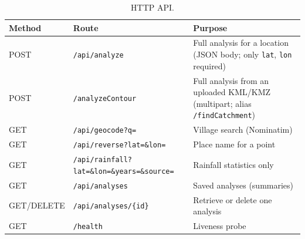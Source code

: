 \documentclass[11pt,a4paper]{article}
\newcommand{\code}[1]{\texttt{\small #1}}
\begin{document}
\begin{table}[H]
\centering\small
\caption{HTTP API.}
\label{tab:api}
\begin{tabularx}{\textwidth}{@{}l>{\raggedright\arraybackslash}p{5.3cm}Y@{}}
\toprule
Method & Route & Purpose \\
\midrule
POST & \code{/api/analyze} & Full analysis for a location (JSON body; only \code{lat}, \code{lon} required) \\
POST & \code{/analyzeContour} & Full analysis from an uploaded KML/KMZ (multipart; alias \code{/findCatchment}) \\
GET & \code{/api/geocode?q=} & Village search (Nominatim) \\
GET & \code{/api/reverse?lat=\&lon=} & Place name for a point \\
GET & \code{/api/rainfall?lat=\&lon=}\newline\code{\&years=\&source=} & Rainfall statistics only \\
GET & \code{/api/analyses} & Saved analyses (summaries) \\
GET/DELETE & \code{/api/analyses/\{id\}} & Retrieve or delete one analysis \\
GET & \code{/health} & Liveness probe \\
\bottomrule
\end{tabularx}
\end{table}
\end{document}
